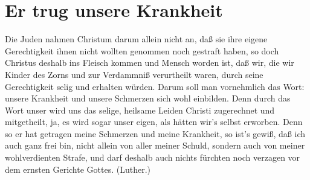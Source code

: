 \chapter[Er trug unsere Krankheit]{Er trug unsere Krankheit}

Die Juden nahmen Christum darum allein nicht an, daß sie ihre eigene Gerechtigkeit ihnen nicht wollten genommen noch gestraft haben, so doch Christus deshalb ins Fleisch kommen und Mensch worden ist, daß wir, die wir Kinder des Zorns und zur Verdammniß verurtheilt waren, durch seine Gerechtigkeit selig und erhalten würden. Darum soll man vornehmlich das Wort: unsere Krankheit und unsere Schmerzen sich wohl einbilden. Denn durch das Wort unser wird uns das selige, heilsame Leiden Christi zugerechnet und mitgetheilt, ja, es wird sogar unser eigen, als hätten wir’s selbst erworben. Denn so er hat getragen meine Schmerzen und meine Krankheit, so ist’s gewiß, daß ich auch ganz frei bin, nicht allein von aller meiner Schuld, sondern auch von meiner wohlverdienten Strafe, und darf deshalb auch nichts fürchten noch verzagen vor dem ernsten Gerichte Gottes. (Luther.)
